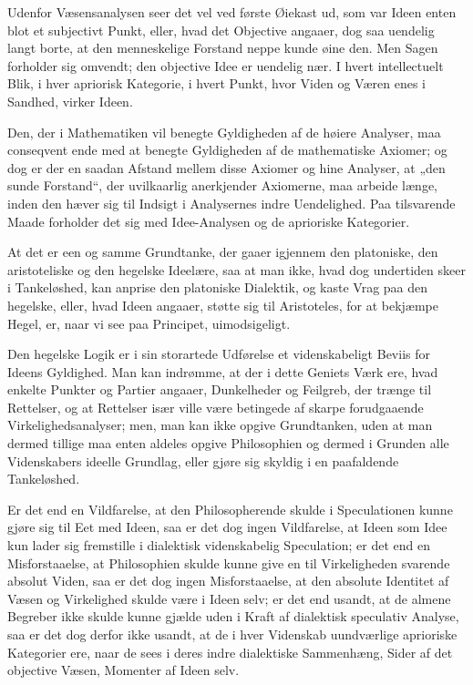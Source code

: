 \documentclass[12pt]{book}
\newcommand{\opage}[1]{\marginnote{\footnotesize\textit{[#1]}}}
\begin{document}
Udenfor Væsensanalysen seer det vel ved første Øiekast ud, som var Ideen enten blot et subjectivt
Punkt, eller, hvad det Objective angaaer, dog saa uendelig langt borte, at den menneskelige Forstand
neppe kunde øine den. Men Sagen forholder sig omvendt; den objective Idee er uendelig nær. I hvert
intellectuelt Blik, i hver apriorisk Kategorie, i hvert Punkt, hvor Viden og Væren enes i Sandhed,
virker Ideen.

\opage{183} Den, der i Mathematiken vil benegte Gyldigheden af de høiere Analyser, maa conseqvent ende med at
benegte Gyldigheden af de mathematiske Axiomer; og dog er der en saadan Afstand mellem disse Axiomer
og hine Analyser, at „den sunde Forstand“, der uvilkaarlig anerkjender Axiomerne, maa arbeide
længe, inden den hæver sig til Indsigt i Analysernes indre Uendelighed. Paa tilsvarende Maade
forholder det sig med Idee-Analysen og de aprioriske Kategorier.

At det er een og samme Grundtanke, der gaaer igjennem den platoniske, den aristoteliske og den
hegelske Ideelære, saa at man ikke, hvad dog undertiden skeer i Tankeløshed, kan anprise den
platoniske Dialektik, og kaste Vrag paa den hegelske, eller, hvad Ideen angaaer, støtte sig til
Aristoteles, for at bekjæmpe Hegel, er, naar vi see paa Principet, uimodsigeligt.

Den hegelske Logik er i sin storartede Udførelse et videnskabeligt Beviis for Ideens Gyldighed. Man
kan indrømme, at der i dette Geniets Værk ere, hvad enkelte Punkter og Partier angaaer, Dunkelheder
og Feilgreb, der trænge til Rettelser, og at Rettelser især ville være betingede af skarpe
forudgaaende Virkelighedsanalyser; men, man kan ikke opgive Grundtanken, uden at man dermed tillige
maa enten aldeles opgive Philosophien og dermed i Grunden alle Videnskabers ideelle Grundlag, eller
gjøre sig skyldig i en paafaldende Tankeløshed.

Er det end en Vildfarelse, at den Philosopherende skulde i Speculationen kunne gjøre sig til Eet med
Ideen, saa er det dog ingen Vildfarelse, at Ideen som Idee kun lader sig fremstille i dialektisk
videnskabelig Speculation; er det end en Misforstaaelse, at Philosophien skulde kunne give en til
Virkeligheden svarende absolut Viden, saa er det dog ingen Misforstaaelse, at den absolute Identitet
af Væsen og Virkelighed skulde være i Ideen selv; er det end usandt, at de almene Begreber ikke
skulde kunne gjælde uden i Kraft
\opage{184} af dialektisk speculativ Analyse, saa er det dog derfor ikke usandt, at de i hver Videnskab
uundværlige aprioriske Kategorier ere, naar de sees i deres indre dialektiske Sammenhæng, Sider af
det objective Væsen, Momenter af Ideen selv.
\end{document}

